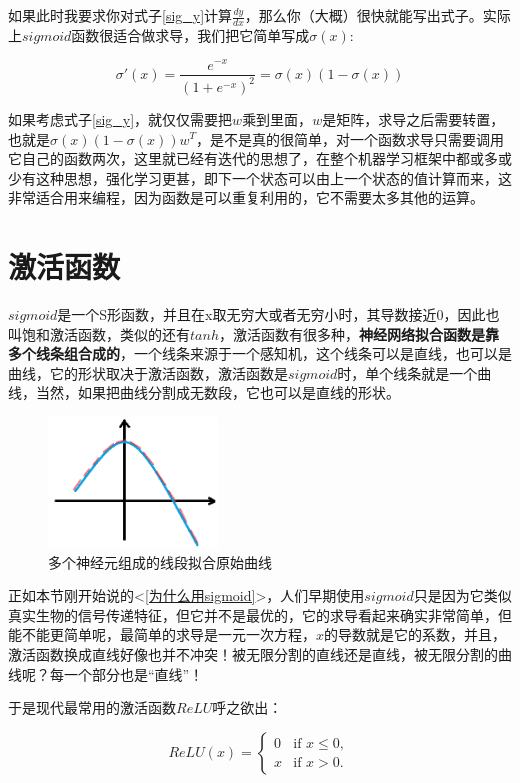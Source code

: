 \documentclass[a5paper, 11pt, openany]{book}
\begin{document}
如果此时我要求你对式子\ref{sig_y}计算$\frac{dy}{dx}$，那么你（大概）很快就能写出式子。实际上$sigmoid$函数很适合做求导，我们把它简单写成$\sigma(x)$:

\begin{equation}
    \sigma'(x) = \frac{e^{-x}}{(1+e^{-x})^2}=\sigma(x)(1 - \sigma(x))
\end{equation}

如果考虑式子\ref{sig_y}，就仅仅需要把$w$乘到里面，$w$是矩阵，求导之后需要转置，也就是$\sigma(x)(1 - \sigma(x))w^T$，是不是真的很简单，对一个函数求导只需要调用它自己的函数两次，这里就已经有迭代的思想了，在整个机器学习框架中都或多或少有这种思想，强化学习更甚，即下一个状态可以由上一个状态的值计算而来，这非常适合用来编程，因为函数是可以重复利用的，它不需要太多其他的运算。

\section{激活函数}
$sigmoid$是一个S形函数，并且在x取无穷大或者无穷小时，其导数接近0，因此也叫饱和激活函数，类似的还有$tanh$，激活函数有很多种，\textbf{神经网络拟合函数是靠多个线条组合成的}，一个线条来源于一个感知机，这个线条可以是直线，也可以是曲线，它的形状取决于激活函数，激活函数是$sigmoid$时，单个线条就是一个曲线，当然，如果把曲线分割成无数段，它也可以是直线的形状。

\begin{figure}[ht]
    \centering
    \includegraphics[width=0.4\textwidth]{figures/拟合线.png}
    \caption{多个神经元组成的线段拟合原始曲线}
    \label{手画拟合线}
\end{figure}

正如本节刚开始说的<\ref{为什么用sigmoid}>，人们早期使用$sigmoid$只是因为它类似真实生物的信号传递特征，但它并不是最优的，它的求导看起来确实非常简单，但能不能更简单呢，最简单的求导是一元一次方程，$x$的导数就是它的系数，并且，激活函数换成直线好像也并不冲突！被无限分割的直线还是直线，被无限分割的曲线呢？每一个部分也是“直线”！

于是现代最常用的激活函数$ReLU$呼之欲出：

\begin{equation}
    \label{Relu函数}
    ReLU(x) =
    \begin{cases}
        0 & \text{if } x \le 0,\\
        x & \text{if } x > 0.
    \end{cases}
\end{equation}
\end{document}
